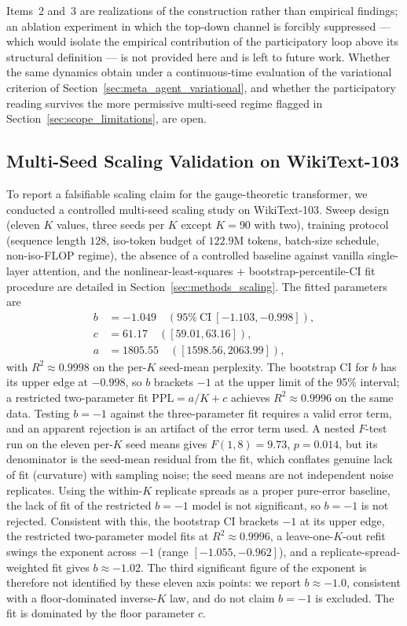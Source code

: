 \documentclass[11pt]{article}
\begin{document}
Items~2 and~3 are realizations of the construction rather than empirical findings; an ablation experiment in which the top-down channel is forcibly suppressed --- which would isolate the empirical contribution of the participatory loop above its structural definition --- is not provided here and is left to future work. Whether the same dynamics obtain under a continuous-time evaluation of the variational criterion of Section~\ref{sec:meta_agent_variational}, and whether the participatory reading survives the more permissive multi-seed regime flagged in Section~\ref{sec:scope_limitations}, are open.

\subsection{Multi-Seed Scaling Validation on WikiText-103}
\label{sec:scaling_validation}

To report a falsifiable scaling claim for the gauge-theoretic transformer, we conducted a controlled multi-seed scaling study on WikiText-103. Sweep design (eleven $K$ values, three seeds per $K$ except $K = 90$ with two), training protocol (sequence length $128$, iso-token budget of $122.9$M tokens, batch-size schedule, non-iso-FLOP regime), the absence of a controlled baseline against vanilla single-layer attention, and the nonlinear-least-squares + bootstrap-percentile-CI fit procedure are detailed in Section~\ref{sec:methods_scaling}. The fitted parameters are
\begin{align*}
b &= -1.049\quad (95\%\ \text{CI}\ [-1.103, -0.998]), \\
c &= 61.17\quad ([59.01, 63.16]), \\
a &= 1805.55\quad ([1598.56, 2063.99]),
\end{align*}
with $R^2 \approx 0.9998$ on the per-$K$ seed-mean perplexity. The bootstrap CI for $b$ has its upper edge at $-0.998$, so $b$ brackets $-1$ at the upper limit of the 95\% interval; a restricted two-parameter fit $\mathrm{PPL} = a/K + c$ achieves $R^2 \approx 0.9996$ on the same data. Testing $b = -1$ against the three-parameter fit requires a valid error term, and an apparent rejection is an artifact of the error term used. A nested $F$-test run on the eleven per-$K$ seed means gives $F(1, 8) = 9.73$, $p = 0.014$, but its denominator is the seed-mean residual from the fit, which conflates genuine lack of fit (curvature) with sampling noise; the seed means are not independent noise replicates. Using the within-$K$ replicate spreads as a proper pure-error baseline, the lack of fit of the restricted $b = -1$ model is not significant, so $b = -1$ is not rejected. Consistent with this, the bootstrap CI brackets $-1$ at its upper edge, the restricted two-parameter model fits at $R^2 \approx 0.9996$, a leave-one-$K$-out refit swings the exponent across $-1$ (range $[-1.055, -0.962]$), and a replicate-spread-weighted fit gives $b \approx -1.02$. The third significant figure of the exponent is therefore not identified by these eleven axis points: we report $b \approx -1.0$, consistent with a floor-dominated inverse-$K$ law, and do not claim $b = -1$ is excluded. The fit is dominated by the floor parameter $c$.
\end{document}

